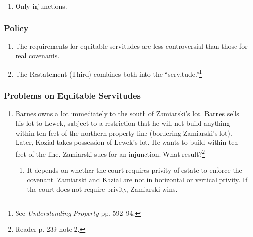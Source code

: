 \begin{enumerate}
    \item Only injunctions.
\end{enumerate}

\subsubsection{Policy}

\begin{enumerate}
    \item The requirements for equitable servitudes are less controversial 
    than those for real covenants.
    \item The Restatement (Third) combines both into the 
    ``servitude.''\footnote{See \emph{Understanding Property} pp. 592--94.}
\end{enumerate}

\subsubsection{Problems on Equitable Servitudes}

\begin{enumerate}
    \item Barnes owns a lot immediately to the south of Zamiarski's lot. 
    Barnes sells his lot to Lewek, subject to a restriction that he will not 
    build anything within ten feet of the northern property line (bordering 
    Zamiarski's lot). Later, Kozial takes possession of Lewek's lot. He wants 
    to build within ten feet of the line. Zamiarski sues for an injunction. 
    What result?\footnote{Reader p. 239 note 2.} %
    \begin{enumerate}
        \item It depends on whether the court requires privity of estate to 
        enforce the covenant. Zamiarski and Kozial are not in horizontal or 
        vertical privity. If the court does not require privity, Zamiarski 
        wins.
    \end{enumerate}
\end{enumerate}
